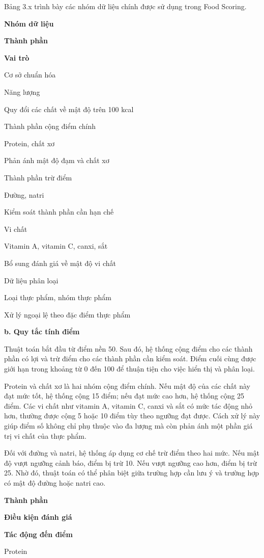 \documentclass[12pt, a4paper]{report}
\begin{document}
Bảng 3.x trình bày các nhóm dữ liệu chính được sử dụng trong Food Scoring.

\textbf{Nhóm dữ liệu}

\textbf{Thành phần}

\textbf{Vai trò}

Cơ sở chuẩn hóa

Năng lượng

Quy đổi các chất về mật độ trên 100 kcal

Thành phần cộng điểm chính

Protein, chất xơ

Phản ánh mật độ đạm và chất xơ

Thành phần trừ điểm

Đường, natri

Kiểm soát thành phần cần hạn chế

Vi chất

Vitamin A, vitamin C, canxi, sắt

Bổ sung đánh giá về mật độ vi chất

Dữ liệu phân loại

Loại thực phẩm, nhóm thực phẩm

Xử lý ngoại lệ theo đặc điểm thực phẩm

\textbf{b. Quy tắc tính điểm}

Thuật toán bắt đầu từ điểm nền 50. Sau đó, hệ thống cộng điểm cho các thành phần có lợi và trừ điểm cho các thành phần cần kiểm soát. Điểm cuối cùng được giới hạn trong khoảng từ 0 đến 100 để thuận tiện cho việc hiển thị và phân loại.

Protein và chất xơ là hai nhóm cộng điểm chính. Nếu mật độ của các chất này đạt mức tốt, hệ thống cộng 15 điểm; nếu đạt mức cao hơn, hệ thống cộng 25 điểm. Các vi chất như vitamin A, vitamin C, canxi và sắt có mức tác động nhỏ hơn, thường được cộng 5 hoặc 10 điểm tùy theo ngưỡng đạt được. Cách xử lý này giúp điểm số không chỉ phụ thuộc vào đa lượng mà còn phản ánh một phần giá trị vi chất của thực phẩm.

Đối với đường và natri, hệ thống áp dụng cơ chế trừ điểm theo hai mức. Nếu mật độ vượt ngưỡng cảnh báo, điểm bị trừ 10. Nếu vượt ngưỡng cao hơn, điểm bị trừ 25. Nhờ đó, thuật toán có thể phân biệt giữa trường hợp cần lưu ý và trường hợp có mật độ đường hoặc natri cao.

\textbf{Thành phần}

\textbf{Điều kiện đánh giá}

\textbf{Tác động đến điểm}

Protein
\end{document}
